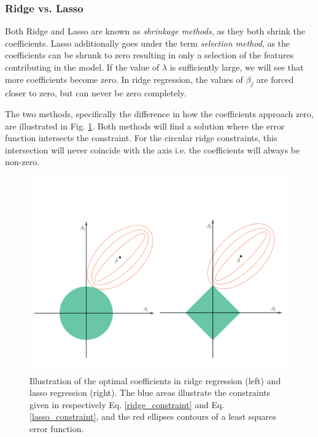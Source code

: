 \subsubsection{Ridge vs. Lasso}
Both Ridge and Lasso are known as \textit{shrinkage methods}, as they both shrink the coefficients. Lasso additionally goes under the term \textit{selection method}, as the coefficients can be shrunk to zero resulting in only a selection of the features contributing in the model. 
If the value of $\lambda$ is sufficiently large, we will see that more coefficients become zero. 
In ridge regression, the values of $\beta_j$ are forced closer to zero, but can never be zero completely. 

The two methods, specifically the difference in how the coefficients approach zero, are illustrated in Fig. \ref{fig:ridge_lasso}. Both methods will find a solution where the error function intersects the constraint. For the circular ridge constraints, this intersection will never coincide with the axis i.e. the coefficients will always be non-zero. 

\begin{figure}[h!]
    \centering
    \includegraphics[width=1\linewidth]{project_1_alt/figures/ridge-lasso.png}
    \caption{Illustration of the optimal coefficients in ridge regression (left) and lasso regression (right). The blue areas illustrate the constraints given in respectively Eq. \ref{ridge_constraint} and Eq. \ref{lasso_constraint}, and the red ellipses contours of a least squares error function. \cite[Taken from][]{hastie}}
    \label{fig:ridge_lasso}
\end{figure}



